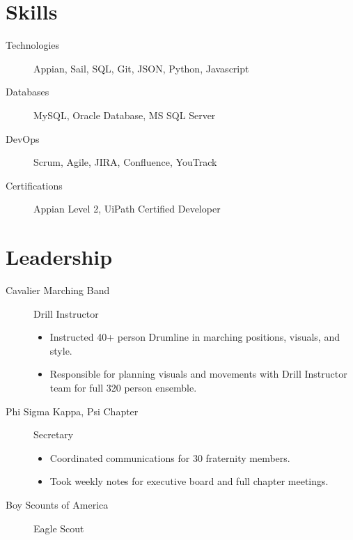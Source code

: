 \documentclass{mycv}
\begin{document}
\section{Skills}
\begin{description}
  \item[Technologies] Appian, Sail, SQL, Git, JSON, Python, Javascript
  \item[Databases] MySQL, Oracle Database, MS SQL Server
  \item[DevOps] Scrum, Agile, JIRA, Confluence, YouTrack
  \item[Certifications] Appian Level 2, UiPath Certified Developer
\end{description}

\section{Leadership}
\vspace{-\parskip}%
\begin{description}
  \item[Cavalier Marching Band] Drill Instructor
  \begin{itemize}
    \item Instructed 40+ person Drumline in marching positions, visuals, and style.
    \item Responsible for planning visuals and movements with Drill Instructor team for full 320 person ensemble.
  \end{itemize} 
  \item[Phi Sigma Kappa, Psi Chapter] Secretary
  \begin{itemize}
    \item Coordinated communications for 30 fraternity members.
    \item Took weekly notes for executive board and full chapter meetings.
  \end{itemize} 
  \item[Boy Scounts of America] Eagle Scout
\end{description}
\end{document}
